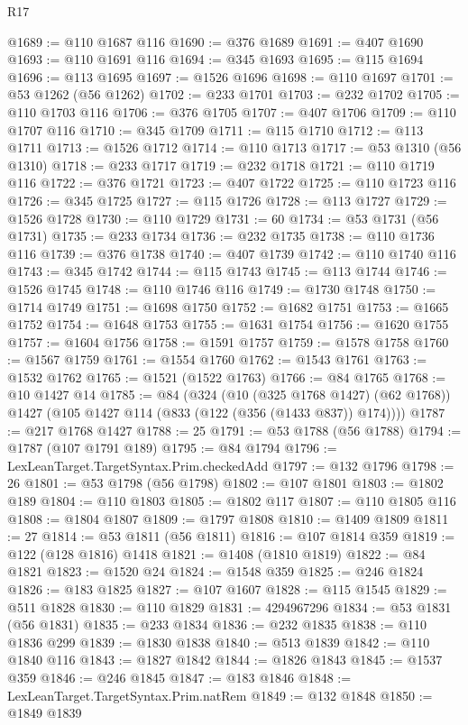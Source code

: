 \begin{lexlean}{R17}
\begin{coremodule}
@1689 := @110 @1687 @116
@1690 := @376 @1689
@1691 := @407 @1690
@1693 := @110 @1691 @116
@1694 := @345 @1693
@1695 := @115 @1694
@1696 := @113 @1695
@1697 := @1526 @1696
@1698 := @110 @1697
@1701 := @53 @1262 (@56 @1262)
@1702 := @233 @1701
@1703 := @232 @1702
@1705 := @110 @1703 @116
@1706 := @376 @1705
@1707 := @407 @1706
@1709 := @110 @1707 @116
@1710 := @345 @1709
@1711 := @115 @1710
@1712 := @113 @1711
@1713 := @1526 @1712
@1714 := @110 @1713
@1717 := @53 @1310 (@56 @1310)
@1718 := @233 @1717
@1719 := @232 @1718
@1721 := @110 @1719 @116
@1722 := @376 @1721
@1723 := @407 @1722
@1725 := @110 @1723 @116
@1726 := @345 @1725
@1727 := @115 @1726
@1728 := @113 @1727
@1729 := @1526 @1728
@1730 := @110 @1729
@1731 := 60
@1734 := @53 @1731 (@56 @1731)
@1735 := @233 @1734
@1736 := @232 @1735
@1738 := @110 @1736 @116
@1739 := @376 @1738
@1740 := @407 @1739
@1742 := @110 @1740 @116
@1743 := @345 @1742
@1744 := @115 @1743
@1745 := @113 @1744
@1746 := @1526 @1745
@1748 := @110 @1746 @116
@1749 := @1730 @1748
@1750 := @1714 @1749
@1751 := @1698 @1750
@1752 := @1682 @1751
@1753 := @1665 @1752
@1754 := @1648 @1753
@1755 := @1631 @1754
@1756 := @1620 @1755
@1757 := @1604 @1756
@1758 := @1591 @1757
@1759 := @1578 @1758
@1760 := @1567 @1759
@1761 := @1554 @1760
@1762 := @1543 @1761
@1763 := @1532 @1762
@1765 := @1521 (@1522 @1763)
@1766 := @84 @1765
@1768 := @10 @1427 @14
@1785 := @84
    (@324
      (@10 (@325 @1768 @1427) (@62 @1768))
      @1427
      (@105 @1427 @114 (@833 (@122 (@356 (@1433 @837)) @174))))
@1787 := @217 @1768 @1427
@1788 := 25
@1791 := @53 @1788 (@56 @1788)
@1794 := @1787 (@107 @1791 @189)
@1795 := @84 @1794
@1796 := LexLeanTarget.TargetSyntax.Prim.checkedAdd
@1797 := @132 @1796
@1798 := 26
@1801 := @53 @1798 (@56 @1798)
@1802 := @107 @1801
@1803 := @1802 @189
@1804 := @110 @1803
@1805 := @1802 @117
@1807 := @110 @1805 @116
@1808 := @1804 @1807
@1809 := @1797 @1808
@1810 := @1409 @1809
@1811 := 27
@1814 := @53 @1811 (@56 @1811)
@1816 := @107 @1814 @359
@1819 := @122 (@128 @1816) @1418
@1821 := @1408 (@1810 @1819)
@1822 := @84 @1821
@1823 := @1520 @24
@1824 := @1548 @359
@1825 := @246 @1824
@1826 := @183 @1825
@1827 := @107 @1607
@1828 := @115 @1545
@1829 := @511 @1828
@1830 := @110 @1829
@1831 := 4294967296
@1834 := @53 @1831 (@56 @1831)
@1835 := @233 @1834
@1836 := @232 @1835
@1838 := @110 @1836 @299
@1839 := @1830 @1838
@1840 := @513 @1839
@1842 := @110 @1840 @116
@1843 := @1827 @1842
@1844 := @1826 @1843
@1845 := @1537 @359
@1846 := @246 @1845
@1847 := @183 @1846
@1848 := LexLeanTarget.TargetSyntax.Prim.natRem
@1849 := @132 @1848
@1850 := @1849 @1839

\end{coremodule}
\end{lexlean}
